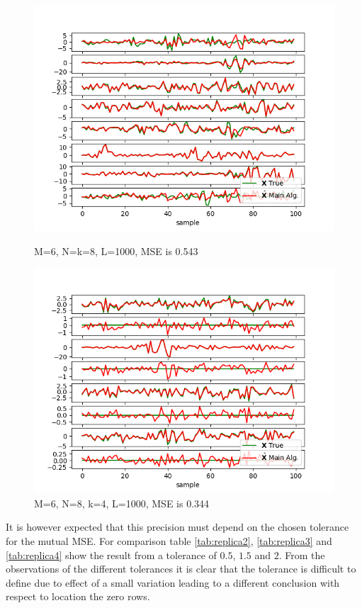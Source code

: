 \begin{figure}[H]
    \begin{minipage}[t]{.45\textwidth}
		\centering
		\includegraphics[scale=0.5]{figures/ch_estimate/k_test2.png}
	\caption{M=6, N=k=8, L=1000, MSE is 0.543}
	\label{fig:ktest2}
    \end{minipage} 
    \hfill
    \begin{minipage}[t]{.45\textwidth}
		\centering
		\includegraphics[scale=0.5]{figures/ch_estimate/k_test3.png}
	\caption{M=6, N=8, k=4, L=1000, MSE is 0.344}
	\label{fig:ktest3}
    \end{minipage}
\end{figure}

It is however expected that this precision must depend on the chosen tolerance for the mutual MSE. For comparison table \ref{tab:replica2}, \ref{tab:replica3} and \ref{tab:replica4} show the result from a tolerance of $0.5$, $1.5$ and $2$. 
From the observations of the different tolerances it is clear that the tolerance is difficult to define due to effect of a small variation leading to a different conclusion with respect to location the zero rows.   

